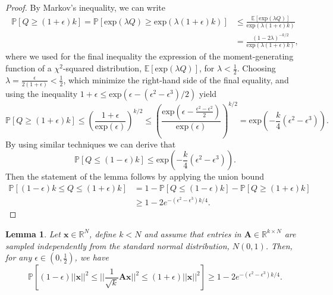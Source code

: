 \documentclass[11pt]{article}
\newtheorem{lemma}{Lemma}
\begin{document}
\begin{proof}
By Markov's inequality, we can write
\begin{equation*}
    \begin{aligned}
        \mathbb{P}[Q\geq(1+\epsilon)k] = \mathbb{P}[\text{exp}(\lambda Q)\geq \text{exp}(\lambda(1+\epsilon)k)] & \leq \frac{\mathbb{E}[\text{exp}(\lambda Q)]}{\text{exp}(\lambda(1+\epsilon)k)} \\
        & = \frac{(1-2\lambda)^{-k/2}}{\text{exp}(\lambda(1+\epsilon)k)},
    \end{aligned}
\end{equation*}
where we used for the final inequality the expression of the moment-generating function of a $\chi^2$-squared distribution, $\mathbb{E}[\text{exp}(\lambda Q)]$, for $\lambda < \frac{1}{2}$. Choosing $\lambda=\frac{\epsilon}{2(1+\epsilon)} < \frac{1}{2}$, which minimize the right-hand side of the final equality, and using the inequality $1+\epsilon \leq \text{exp}(\epsilon-(\epsilon^2-\epsilon^3)/2)$ yield
\[
\mathbb{P}[Q\geq(1+\epsilon)k] \leq \left(\frac{1+\epsilon}{\text{exp}(\epsilon)}\right)^{k/2} \leq \left(\frac{\text{exp}(\epsilon-\frac{\epsilon^2-\epsilon^2}{2})}{\text{exp}(\epsilon)}\right)^{k/2} = \text{exp}\left(-\frac{k}{4}(\epsilon^2-\epsilon^3)\right).
\]
By using similar techniques we can derive that
\[
\mathbb{P}[Q\leq(1-\epsilon)k] \leq \text{exp}\left(-\frac{k}{4}(\epsilon^2-\epsilon^3)\right).
\]
Then the statement of the lemma follows by applying the union bound
\begin{equation*}
    \begin{aligned}
        \mathbb{P}[(1-\epsilon)k \leq Q \leq (1+\epsilon)k] & = 1-\mathbb{P}[Q\leq(1-\epsilon)k]-\mathbb{P}[Q\geq(1+\epsilon)k] \\
        & \geq 1-2e^{-(\epsilon^2-\epsilon^3)k/4}.
    \end{aligned}
\end{equation*}
\end{proof}

\begin{lemma}
    \label{L3}
    Let $\textbf{x}\in\mathbb{R}^N$, define $k<N$ and assume that entries in $\textbf{A}\in\mathbb{R}^{k\times N}$ are sampled independently from the standard normal distribution, $N(0,1)$. Then, for any $\epsilon\in(0,\frac{1}{2})$, we have
    \[
    \mathbb{P}\left[(1-\epsilon)||\textbf{x}||^2 \leq ||\frac{1}{\sqrt{k}}\textbf{Ax}||^2 \leq (1+\epsilon)||\textbf{x}||^2\right] \geq 1-2e^{-(\epsilon^2-\epsilon^3)k/4}.
    \]
\end{lemma}
\end{document}
